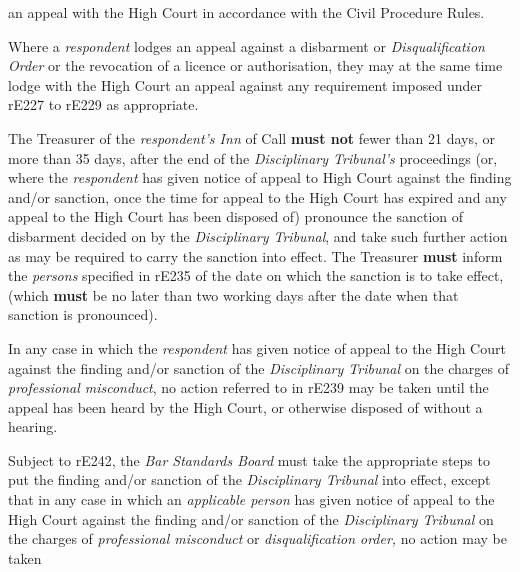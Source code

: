 an appeal with the High Court in accordance with the Civil Procedure
Rules.\\
\par
Where a \emph{respondent} lodges an appeal against a disbarment
or \emph{Disqualification Order} or the revocation of a licence or
authorisation, they may at the same time lodge with the High Court an
appeal against any requirement imposed under rE227 to rE229 as
appropriate.\\
\par
{}
The Treasurer of the \emph{respondent's Inn }of Call  \textcolor{myred}{\textbf{must not}} fewer than
21 days, or more than 35 days, after the end of the \emph{Disciplinary
Tribunal's} proceedings (or, where the \emph{respondent} has given
notice of appeal to High Court against the finding and/or sanction, once
the time for appeal to the High Court has expired and any appeal to the
High Court has been disposed of) pronounce the sanction of disbarment
decided on by the \emph{Disciplinary Tribunal}, and take such further
action as may be required to carry the sanction into effect. The
Treasurer  \textcolor{myred}{\textbf{must}} inform the \emph{persons} specified in rE235 of the date
on which the sanction is to take effect, (which  \textcolor{myred}{\textbf{must}} be no later than
two working days after the date when that sanction is pronounced).\\
\par
In any case in which the \emph{respondent} has given notice of appeal to
the High Court against the finding and/or sanction of
the \emph{Disciplinary Tribunal} on the charges of \emph{professional
misconduct}, no action referred to in rE239 may be taken until the
appeal has been heard by the High Court, or otherwise disposed of
without a hearing.\\
\par
{}
Subject to rE242, the \emph{Bar Standards Board }must take the
appropriate steps to put the finding and/or sanction of
the \emph{Disciplinary Tribunal }into effect, except that in any case in
which an \emph{applicable person }has given notice of appeal to the High
Court against the finding and/or sanction of the \emph{Disciplinary
Tribunal }on the charges of \emph{professional
misconduct }or \emph{disqualification order, }no action may be taken
